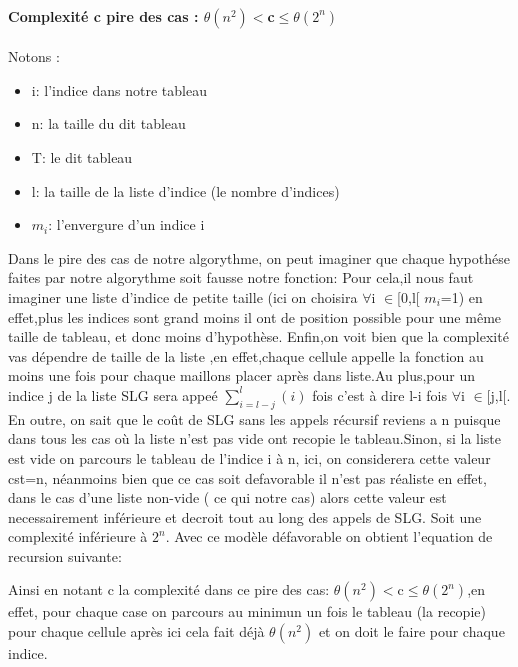 \documentclass{article}
\begin{document}
\paragraph{Complexit\'e c pire des cas : $\theta(n^2) <$c$\leq\theta(2^n)$\\ }
 Notons :
\begin{itemize}
\item i: l'indice dans notre tableau
\item n: la taille du dit tableau
\item T: le dit tableau
\item l: la taille de la liste d'indice (le nombre d'indices)
\item $m_i$: l'envergure d'un indice i
\end{itemize}
Dans le pire des cas de notre algorythme, on peut imaginer que chaque hypoth\'ese faites par notre algorythme soit fausse notre fonction: Pour cela,il nous faut imaginer une liste d'indice de petite taille (ici on choisira $\forall$i $\in$[0,l[ $m_i$=1) en effet,plus les indices sont grand moins il ont de position possible pour une m\^eme taille de tableau, et donc moins d'hypothèse.
\newline Enfin,on voit bien que la complexit\'e vas d\'ependre de taille de la liste ,en effet,chaque cellule appelle la fonction au moins une fois pour chaque maillons placer après dans liste.Au plus,pour un indice j de la liste SLG sera appeé $\sum_{i=l-j}^{l} (i)$ fois c'est à dire l-i fois $\forall$i $\in$[j,l[.
\newline En outre, on sait que le co\^ut de SLG sans les appels r\'ecursif reviens a n puisque dans tous les cas o\`u la liste n'est pas vide ont recopie le tableau.Sinon, si la liste est vide on parcours le tableau de l'indice i à n, ici, on considerera cette valeur cst=n, n\'eanmoins bien que ce cas soit defavorable il n'est pas r\'ealiste en effet, dans le cas d'une liste non-vide ( ce qui notre cas) alors cette valeur est necessairement inférieure et decroit tout au long des appels de SLG.
Soit une complexit\'e inf\'erieure \`a $2^n$.
\newline
Avec ce modèle défavorable on obtient l'equation de recursion suivante:
\begin{center}
\end{center}
Ainsi en notant c la complexité dans ce pire des cas: $\theta(n^2) <$c$\leq\theta(2^n)$,en effet, pour chaque case on parcours au minimun un fois le tableau (la recopie) pour chaque cellule après ici cela fait d\'ej\`a $\theta(n^2)$ et on doit le faire pour chaque indice.
\end{document}

